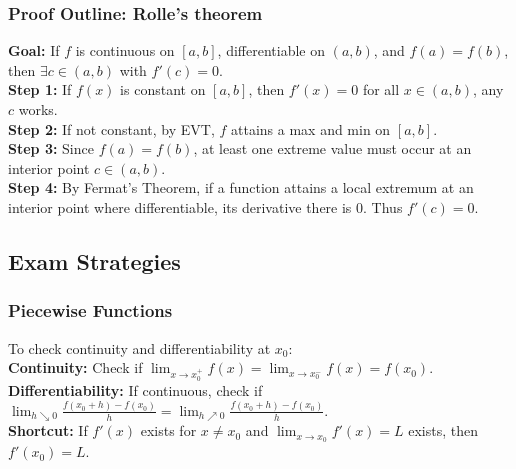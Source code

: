 \subsubsection{Proof Outline: Rolle's theorem}
\textbf{Goal:} If $f$ is continuous on $[a,b]$, differentiable on $(a,b)$, and $f(a)=f(b)$, then $\exists c \in (a,b)$ with $f'(c)=0$. \\
\textbf{Step 1:} If $f(x)$ is constant on $[a,b]$, then $f'(x) = 0$ for all $x \in (a,b)$, any $c$ works. \\
\textbf{Step 2:} If not constant, by EVT, $f$ attains a max and min on $[a,b]$. \\
\textbf{Step 3:} Since $f(a)=f(b)$, at least one extreme value must occur at an interior point $c \in (a,b)$. \\
\textbf{Step 4:} By Fermat's Theorem, if a function attains a local extremum at an interior point where differentiable, its derivative there is $0$. Thus $f'(c) = 0$.


\subsection{Exam Strategies}

\subsubsection{Piecewise Functions}
To check continuity and differentiability at $x_0$: \\
\textbf{Continuity:} Check if $\lim_{x \to x_0^+} f(x) = \lim_{x \to x_0^-} f(x) = f(x_0)$. \\
\textbf{Differentiability:} If continuous, check if $\lim_{h \searrow 0} \frac{f(x_0+h)-f(x_0)}{h} = \lim_{h \nearrow 0} \frac{f(x_0+h)-f(x_0)}{h}$. \\
\textbf{Shortcut:} If $f'(x)$ exists for $x \neq x_0$ and $\lim_{x \to x_0} f'(x) = L$ exists, then $f'(x_0) = L$.


